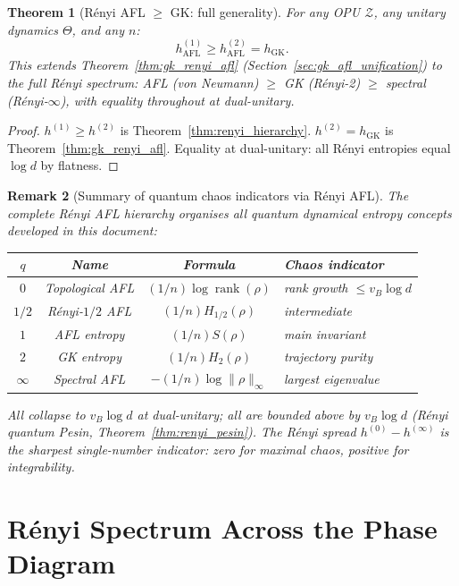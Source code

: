 \documentclass[12pt,a4paper]{article}
\newtheorem{theorem}{Theorem}[section]
\newtheorem{remark}[theorem]{Remark}
\begin{document}
\begin{theorem}[Rényi AFL $\geq$ GK: full generality]
  \label{thm:renyi_afl_gk}
  For any OPU $\mathcal{Z}$, any unitary dynamics $\Theta$, and any $n$:
  \[
    h_{\mathrm{AFL}}^{(1)} \geq h_{\mathrm{AFL}}^{(2)} = h_{\mathrm{GK}}.
  \]
  This extends Theorem~\ref{thm:gk_renyi_afl} (Section~\ref{sec:gk_afl_unification})
  to the full R\'enyi spectrum:
  AFL (von Neumann) $\geq$ GK (R\'enyi-2) $\geq$ spectral (R\'enyi-$\infty$),
  with equality throughout at dual-unitary.
\end{theorem}
\begin{proof}
  $h^{(1)} \geq h^{(2)}$ is Theorem~\ref{thm:renyi_hierarchy}.
  $h^{(2)} = h_{\mathrm{GK}}$ is Theorem~\ref{thm:gk_renyi_afl}.
  Equality at dual-unitary: all R\'enyi entropies equal $\log d$ by flatness.
\end{proof}

\begin{remark}[Summary of quantum chaos indicators via R\'enyi AFL]
  The complete R\'enyi AFL hierarchy organises all quantum dynamical entropy
  concepts developed in this document:
  \begin{center}
  \begin{tabular}{c|c|c|l}
  \hline
  $q$ & Name & Formula & Chaos indicator \\
  \hline
  $0$   & Topological AFL & $(1/n)\log\operatorname{rank}(\rho)$ & rank growth $\leq v_B\log d$ \\
  $1/2$ & R\'enyi-$1/2$ AFL & $(1/n)H_{1/2}(\rho)$ & intermediate \\
  $1$   & AFL entropy & $(1/n)S(\rho)$ & main invariant \\
  $2$   & GK entropy & $(1/n)H_2(\rho)$ & trajectory purity \\
  $\infty$ & Spectral AFL & $-(1/n)\log\|\rho\|_\infty$ & largest eigenvalue \\
  \hline
  \end{tabular}
  \end{center}
  All collapse to $v_B\log d$ at dual-unitary; all are bounded above by $v_B\log d$
  (R\'enyi quantum Pesin, Theorem~\ref{thm:renyi_pesin}).
  The R\'enyi spread $h^{(0)}-h^{(\infty)}$ is the sharpest single-number
  indicator: zero for maximal chaos, positive for integrability.
\end{remark}

\section{R\'enyi Spectrum Across the Phase Diagram}
\label{sec:renyi_phase}
\end{document}
